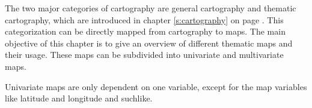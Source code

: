 The two major categories of cartography are general cartography and thematic cartography, which are introduced in chapter \ref{s:cartography} on page \pageref{s:cartography}. This categorization can be directly mapped from cartography to maps. The main objective of this chapter is to give an overview of different thematic maps and their usage. These maps can be subdivided into univariate and multivariate maps.

Univariate maps are only dependent on one variable, except for the map variables like latitude and longitude and suchlike.






\label{s:choropleth}

